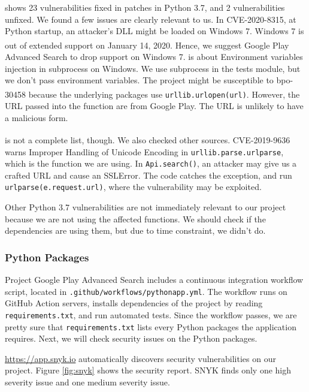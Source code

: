 \documentclass[12pt, a4paper]{article}
\newcommand{\code}[1]{\texttt{#1}}
\begin{document}
\cite{python37-vulnerability} shows 23 vulnerabilities fixed in patches in Python 3.7, and 2 vulnerabilities unfixed. We found a few issues are clearly relevant to us. In CVE-2020-8315, at Python startup, an attacker's DLL might be loaded on Windows 7. Windows 7 is out of extended support on January 14, 2020.\textsuperscript{\cite{windows7}} Hence, we suggest Google Play Advanced Search to drop support on Windows 7. \cite{bpo-30730} is about Environment variables injection in subprocess on Windows. We use subprocess in the tests module, but we don't pass environment variables. The project might be susceptible to bpo-30458\textsuperscript{\cite{bpo-30458}} because the underlying packages use \code{urllib.urlopen(url)}. However, the URL passed into the function are from Google Play. The URL is unlikely to have a malicious form.

\cite{python37-vulnerability} is not a complete list, though. We also checked other sources. CVE-2019-9636\textsuperscript{\cite{CVE-2019-9636}} warns Improper Handling of Unicode Encoding in \code{urllib\linebreak[0].parse\linebreak[0].urlparse}, which is the function we are using. In \code{Api.search()}, an attacker may give us a crafted URL and cause an SSLError. The code catches the exception, and run \code{urlparse(e.request.url)}, where the vulnerability may be exploited.

Other Python 3.7 vulnerabilities are not immediately relevant to our project because we are not using the affected functions. We should check if the dependencies are using them, but due to time constraint, we didn't do.

\subsubsection{Python Packages}
Project Google Play Advanced Search includes a continuous integration workflow script, located in \code{.github/workflows/pythonapp.yml}. The workflow runs on GitHub Action servers, installs dependencies of the project by reading \code{requirements.txt}, and run automated tests. Since the workflow passes, we are pretty sure that \code{requirements.txt} lists every Python packages the application requires. Next, we will check security issues on the Python packages.

\url{https://app.snyk.io} automatically discovers security vulnerabilities on our project. Figure \ref{fig:snyk} shows the security report. SNYK finds only one high severity issue and one medium severity issue. 
\end{document}
